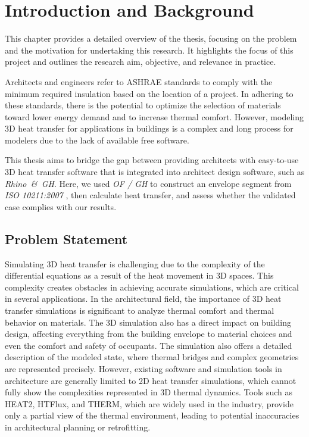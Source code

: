\chapter{Introduction and Background}
This chapter provides a detailed overview of the thesis, focusing on the problem and the motivation for undertaking this research. It highlights the focus of this project and outlines the research aim, objective, and relevance in practice.

Architects and engineers refer to \gls{ASHRAE} standards to comply with the minimum required insulation based on the location of a project. 
In adhering to these standards, there is the potential to optimize the selection of materials toward lower energy demand and to increase thermal comfort. 
However, modeling 3D heat transfer for applications in buildings is a complex and long process for modelers due to the lack of available free software. 

This thesis aims to bridge the gap between providing architects with easy-to-use 3D heat transfer software that is integrated into architect design software, such as \textit{Rhino\, \&\, \gls{GH}}. Here, we used \textit{\gls{OF} / \gls{GH}} to construct an envelope segment from \textit{ISO 10211:2007}
\cite{ISO}, then calculate heat transfer, and assess whether the validated case complies with our results. 



\section{Problem Statement}
Simulating 3D heat transfer is challenging due to the complexity of the differential equations as a result of the heat movement in 3D spaces. This complexity creates obstacles in achieving accurate simulations, which are critical in several applications. In the architectural field, the importance of 3D heat transfer simulations is significant to analyze thermal comfort and thermal behavior on materials. The 3D simulation also has a direct impact on building design, affecting everything from the building envelope to material choices and even the comfort and safety of occupants. The simulation also offers a detailed description of the modeled state, where thermal bridges and complex geometries are represented precisely.
However, existing software and simulation tools in architecture are generally limited to 2D heat transfer simulations, which cannot fully show the complexities represented in 3D thermal dynamics. Tools such as HEAT2, HTFlux, and THERM, which are widely used in the industry, provide only a partial view of the thermal environment, leading to potential inaccuracies in architectural planning or retrofitting.

